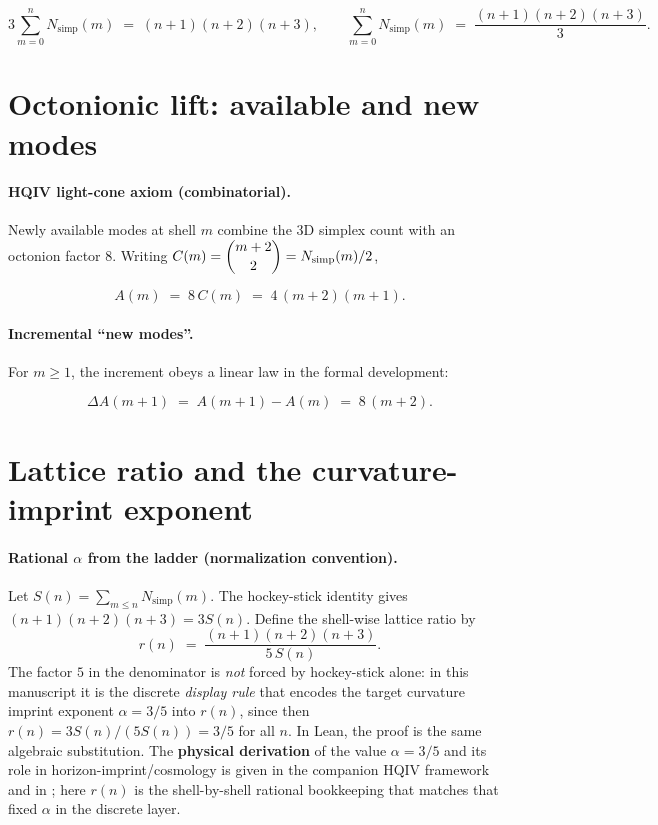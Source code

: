 \documentclass[11pt,a4paper]{article}
\theoremstyle{remark}
\begin{document}
\begin{equation}
  3\sum_{m=0}^{n} N_{\mathrm{simp}}(m) \;=\; (n+1)(n+2)(n+3),
  \qquad
  \sum_{m=0}^{n} N_{\mathrm{simp}}(m) \;=\; \frac{(n+1)(n+2)(n+3)}{3}.
\end{equation}

\section{Octonionic lift: available and new modes}

\paragraph{HQIV light-cone axiom (combinatorial).}
Newly available modes at shell $m$ combine the $3$D simplex count with an octonion factor $8$. Writing $C(m)=\dbinom{m+2}{2}=N_{\mathrm{simp}}(m)/2$,

\begin{equation}
  A(m) \;=\; 8\,C(m) \;=\; 4\,(m+2)(m+1).
\end{equation}

\paragraph{Incremental ``new modes''.}
For $m\ge 1$, the increment obeys a linear law in the formal development:

\begin{equation}
  \Delta A(m+1) \;=\; A(m+1)-A(m) \;=\; 8\,(m+2).
\end{equation}

\section{Lattice ratio and the curvature-imprint exponent}

\paragraph{Rational $\alpha$ from the ladder (normalization convention).}
Let $S(n)=\sum_{m\le n}N_{\mathrm{simp}}(m)$. The hockey-stick identity gives $(n+1)(n+2)(n+3)=3S(n)$. Define the shell-wise lattice ratio by
\begin{equation}
  r(n) \;=\; \frac{(n+1)(n+2)(n+3)}{5\,S(n)}.
\end{equation}
The factor $5$ in the denominator is \emph{not} forced by hockey-stick alone: in this manuscript it is the discrete \emph{display rule} that encodes the target curvature imprint exponent $\alpha=3/5$ into $r(n)$, since then $r(n)=3S(n)/(5S(n))=3/5$ for all $n$. In Lean, the proof is the same algebraic substitution. The \textbf{physical derivation} of the value $\alpha=3/5$ and its role in horizon-imprint/cosmology is given in the companion HQIV framework \cite{ettinger2026hqiv} and in \cite{brodie2026}; here $r(n)$ is the shell-by-shell rational bookkeeping that matches that fixed $\alpha$ in the discrete layer.
\end{document}
